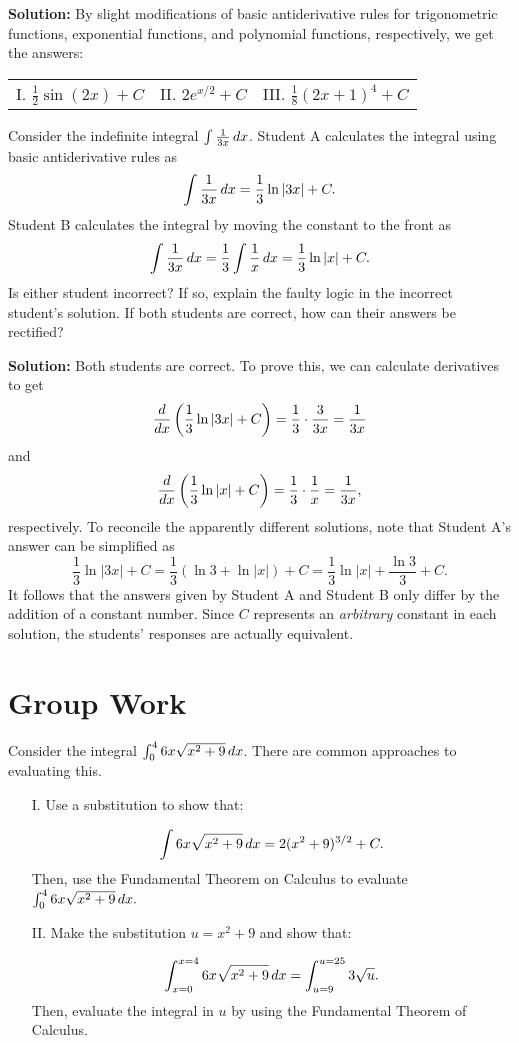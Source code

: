 \documentclass[handout,hints]{ximera}
\begin{document}
\textbf{Solution:} By slight modifications of basic antiderivative rules for trigonometric functions, exponential functions, and polynomial functions, respectively, we get the answers:

\begin{tabular}{lll} 
I. $\frac{1}{2} \sin(2x) + C$ \hspace{.7in} & II. $2 e^{x/2} + C$ \hspace{.7in} & III. $\frac{1}{8} (2x+1)^4 + C$
\end{tabular}

\begin{problem}
Consider the indefinite integral $\int \frac{1}{3x} \mathop{}\!d x$. Student A calculates the integral using basic antiderivative rules as
$$
\int \frac{1}{3x} \mathop{}\!d x = \frac{1}{3} \ln |3x| + C.
$$
Student B calculates the integral by moving the constant to the front as 
$$
\int \frac{1}{3x} \mathop{}\!d x = \frac{1}{3} \int \frac{1}{x} \mathop{}\!d x = \frac{1}{3} \ln |x| + C.
$$
Is either student incorrect?  If so, explain the faulty logic in the incorrect student's solution.  If both students are correct, how can their answers be rectified?

\end{problem}

\textbf{Solution:} Both students are correct. To prove this, we can calculate derivatives to get
$$
\frac{\mathop{}\!d}{\mathop{}\!d x} \left(\frac{1}{3} \ln |3x| + C\right) = \frac{1}{3} \cdot  \frac{3}{3x} = \frac{1}{3x}
$$
and 
$$
\frac{\mathop{}\!d}{\mathop{}\!d x} \left(\frac{1}{3} \ln |x| + C\right) = \frac{1}{3} \cdot \frac{1}{x} = \frac{1}{3x},
$$
respectively. To reconcile the apparently different solutions, note that Student A's answer can be simplified as
$$
\frac{1}{3} \ln |3x| + C = \frac{1}{3} \left(\ln 3 + \ln |x|\right) + C = \frac{1}{3} \ln |x| + \frac{\ln 3}{3} + C.
$$
It follows that the answers given by Student A and Student B only differ by the addition of a constant number. Since $C$ represents an \textit{arbitrary} constant in each solution, the students' responses are actually equivalent.

\section{Group Work}

\begin{problem}
Consider the integral $\int_0^4  6x\sqrt{x^2+9} \mathop{}\!d x$.  There are common approaches to evaluating this.

\begin{itemize}
\item[I.] Use a substitution to show that:

\[\int  6x\sqrt{x^2+9} \mathop{}\!d x = 2 (x^2 + 9)^{3/2} + C.\]  
Then, use the Fundamental Theorem on Calculus to evaluate $\int_0^4  6x\sqrt{x^2+9} \mathop{}\!d x.$ 

\item[II.] Make the substitution $u=x^2+9$ and show that:

\[\int_{x=0}^{x=4}  6x\sqrt{x^2+9} \mathop{}\!d x = \int_{u=9}^{u=25} 3\sqrt{u}.\]  Then, evaluate the integral in $u$ by using the Fundamental Theorem of Calculus.
\end{itemize}
\end{problem}
\end{document}

